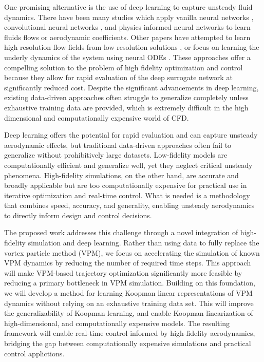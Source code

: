 \documentclass[12pt, letterpaper]{article}
\begin{document}
One promising alternative is the use of deep learning to capture unsteady fluid dynamics.  There have been many studies which apply vanilla neural networks \cite{collotta2014arealtime, sabater2021fast}, convolutional neural networks \cite{abucide2021adata, hwang2025aerodynamic}, and physics informed neural networks \cite{raissi2019physics, lin2025aphysics} to learn fluids flows or aerodynamic coefficients.  Other papers have attempted to learn high resolution flow fields from low resolution solutions \cite{sharma2025accelerating, gao2021super}, or focus on learning the underly dynamics of the system using neural ODEs \cite{jarry2025neuralodeapproachaircraft, ma2024development}.  These approaches offer a compelling solution to the problem of high fidelity optimization and control because they allow for rapid evaluation of the deep surrogate network at significantly reduced cost.  Despite the significant advancements in deep learning, existing data-driven approaches often struggle to generalize completely unless exhaustive training data are provided, which is extremely difficult in the high dimensional and computationally expensive world of CFD. 

Deep learning offers the potential for rapid evaluation and can capture unsteady aerodynamic effects, but traditional data-driven approaches often fail to generalize without prohibitively large datasets. Low-fidelity models are computationally efficient and generalize well, yet they neglect critical unsteady phenomena. High-fidelity simulations, on the other hand, are accurate and broadly applicable but are too computationally expensive for practical use in iterative optimization and real-time control. What is needed is a methodology that combines speed, accuracy, and generality, enabling unsteady aerodynamics to directly inform design and control decisions.

The proposed work addresses this challenge through a novel integration of high-fidelity simulation and deep learning. Rather than using data to fully replace the vortex particle method (VPM), we focus on accelerating the simulation of known VPM dynamics by reducing the number of required time steps. This approach will make VPM-based trajectory optimization significantly more feasible by reducing a primary bottleneck in VPM simulation. Building on this foundation, we will develop a method for learning Koopman linear representations of VPM dynamics without relying on an exhaustive training data set. This will improve the generalizability of Koopman learning, and enable Koopman linearization of high-dimensional, and computationally expensive models.  The resulting framework will enable real-time control informed by high-fidelity aerodynamics, bridging the gap between computationally expensive simulations and practical control applictions.
\end{document}
